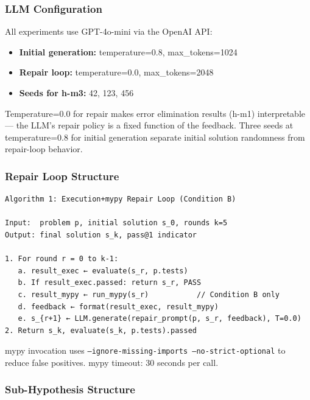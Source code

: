 \subsubsection{LLM Configuration}

All experiments use GPT-4o-mini via the OpenAI API:

\begin{itemize}
\item \textbf{Initial generation:} temperature=0.8, max\_tokens=1024
\item \textbf{Repair loop:} temperature=0.0, max\_tokens=2048
\item \textbf{Seeds for h-m3:} {42, 123, 456}
\end{itemize}

Temperature=0.0 for repair makes error elimination results (h-m1) interpretable --- the LLM's repair policy is a fixed function of the feedback. Three seeds at temperature=0.8 for initial generation separate initial solution randomness from repair-loop behavior.

\subsubsection{Repair Loop Structure}

\begin{verbatim}
Algorithm 1: Execution+mypy Repair Loop (Condition B)

Input:  problem p, initial solution s_0, rounds k=5
Output: final solution s_k, pass@1 indicator

1. For round r = 0 to k-1:
   a. result_exec ← evaluate(s_r, p.tests)
   b. If result_exec.passed: return s_r, PASS
   c. result_mypy ← run_mypy(s_r)           // Condition B only
   d. feedback ← format(result_exec, result_mypy)
   e. s_{r+1} ← LLM.generate(repair_prompt(p, s_r, feedback), T=0.0)
2. Return s_k, evaluate(s_k, p.tests).passed
\end{verbatim}

mypy invocation uses \texttt{--ignore-missing-imports --no-strict-optional} to reduce false positives. mypy timeout: 30 seconds per call.

\subsubsection{Sub-Hypothesis Structure}

